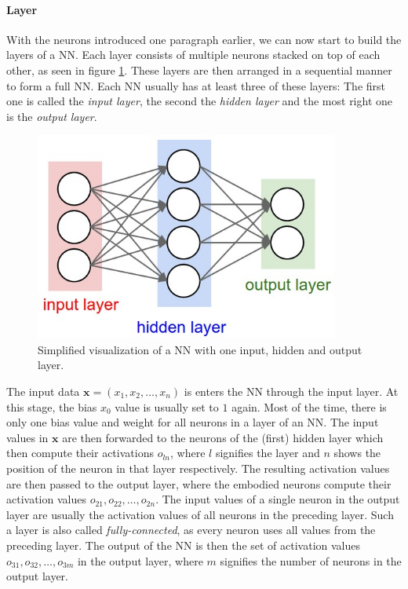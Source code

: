 \paragraph{Layer}\label{basic:neural_network:layer} With the neurons introduced one paragraph earlier, we can now start to build the layers of a NN. Each layer consists of multiple neurons stacked on top of each other, as seen in figure \ref{fundamentals:figures:neural_network}. These layers are then arranged in a sequential manner to form a full NN. Each NN usually has at least three of these layers: The first one is called the \emph{input layer}, the second the \emph{hidden layer} and the most right one is the \emph{output layer}.

\begin{figure}[h]
	\centering
	\includegraphics[width=10cm]{img/basic_neural_network}
	\caption{Simplified visualization of a NN with one input, hidden and output layer.}
	\label{fundamentals:figures:neural_network}
\end{figure}

The input data $\mathbf{x} = (x_1, x_2, \dots, x_n)$ is enters the NN through the input layer. At this stage, the bias $x_0$ value is usually set to $1$ again. Most of the time, there is only one bias value and weight for all neurons in a layer of an NN. The input values in $\mathbf{x}$ are then forwarded to the neurons of the (first) hidden layer which then compute their activations $o_{ln}$, where $l$ signifies the layer and $n$ shows the position of the neuron in that layer respectively. The resulting activation values are then passed to the output layer, where the embodied neurons compute their activation values $o_{21}, o_{22}, \dots, o_{2n}$. The input values of a single neuron in the output layer are usually the activation values of all neurons in the preceding layer. Such a layer is also called \emph{fully-connected}, as every neuron uses all values from the preceding layer. The output of the NN is then the set of activation values $o_{31}, o_{32}, \dots, o_{3m}$ in the output layer, where $m$ signifies the number of neurons in the output layer.

